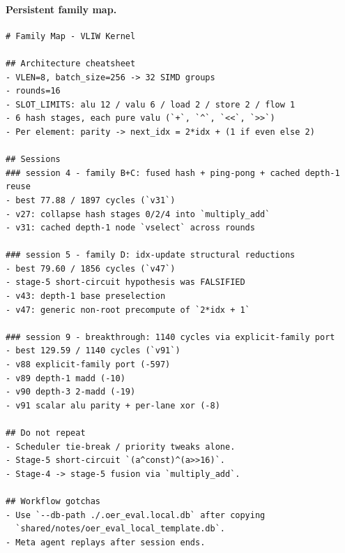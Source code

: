 \paragraph{Persistent family map.}
\begin{lstlisting}[style=papercode]
# Family Map - VLIW Kernel

## Architecture cheatsheet
- VLEN=8, batch_size=256 -> 32 SIMD groups
- rounds=16
- SLOT_LIMITS: alu 12 / valu 6 / load 2 / store 2 / flow 1
- 6 hash stages, each pure valu (`+`, `^`, `<<`, `>>`)
- Per element: parity -> next_idx = 2*idx + (1 if even else 2)

## Sessions
### session 4 - family B+C: fused hash + ping-pong + cached depth-1 reuse
- best 77.88 / 1897 cycles (`v31`)
- v27: collapse hash stages 0/2/4 into `multiply_add`
- v31: cached depth-1 node `vselect` across rounds

### session 5 - family D: idx-update structural reductions
- best 79.60 / 1856 cycles (`v47`)
- stage-5 short-circuit hypothesis was FALSIFIED
- v43: depth-1 base preselection
- v47: generic non-root precompute of `2*idx + 1`

### session 9 - breakthrough: 1140 cycles via explicit-family port
- best 129.59 / 1140 cycles (`v91`)
- v88 explicit-family port (-597)
- v89 depth-1 madd (-10)
- v90 depth-3 2-madd (-19)
- v91 scalar alu parity + per-lane xor (-8)

## Do not repeat
- Scheduler tie-break / priority tweaks alone.
- Stage-5 short-circuit `(a^const)^(a>>16)`.
- Stage-4 -> stage-5 fusion via `multiply_add`.

## Workflow gotchas
- Use `--db-path ./.oer_eval.local.db` after copying
  `shared/notes/oer_eval_local_template.db`.
- Meta agent replays after session ends.
\end{lstlisting}


